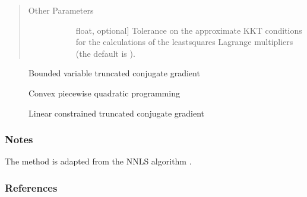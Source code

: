 \documentclass[letterpaper,10pt,english]{sphinxmanual}
\begin{document}
\begin{fulllineitems}
\begin{quote}
\begin{description}
\begin{description}
\end{description}

\item[{Other Parameters}] \leavevmode\begin{description}
\item[{}] \leavevmode{[}float, optional{]}
\sphinxAtStartPar
Tolerance on the approximate KKT conditions for the calculations of the
least\sphinxhyphen{}squares Lagrange multipliers (the default is
).

\end{description}

\end{description}\end{quote}


\nopagebreak

\begin{description}
\item[{{\hyperref[\detokenize{refs/generated/cobyqa.linalg.bvtcg:cobyqa.linalg.bvtcg}]{}}}] \leavevmode
\sphinxAtStartPar
Bounded variable truncated conjugate gradient

\item[{{\hyperref[\detokenize{refs/generated/cobyqa.linalg.cpqp:cobyqa.linalg.cpqp}]{}}}] \leavevmode
\sphinxAtStartPar
Convex piecewise quadratic programming

\item[{{\hyperref[\detokenize{refs/generated/cobyqa.linalg.lctcg:cobyqa.linalg.lctcg}]{}}}] \leavevmode
\sphinxAtStartPar
Linear constrained truncated conjugate gradient

\end{description}


\subsubsection*{Notes}

\sphinxAtStartPar
The method is adapted from the NNLS algorithm .
\subsubsection*{References}

\sphinxAtStartPar
{}

\end{fulllineitems}
\end{document}
